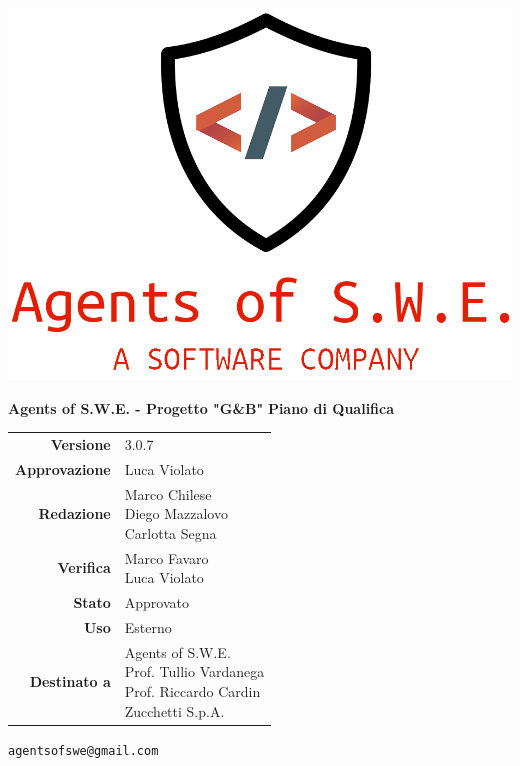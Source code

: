 


\begin{titlepage}
\thispagestyle{empty}

\begin{center}

\includegraphics[scale=0.3]{./images/logo.png} 

\large \textbf{Agents of S.W.E. - Progetto "G\&B"}
\vfill
\Huge \textbf{Piano di Qualifica}
\vfill
\large
\renewcommand{\arraystretch}{1.3}
\begin{tabular}{r|l}
\textbf{Versione} & 3.0.7\\
\textbf{Approvazione} & Luca Violato\\
\textbf{Redazione} & \parbox[t]{5cm}{Marco Chilese\\Diego Mazzalovo\\Carlotta Segna}\\
\textbf{Verifica} & \parbox[t]{5cm}{Marco Favaro\\Luca Violato}\\
\textbf{Stato} & Approvato\\
\textbf{Uso} & Esterno\\
\textbf{Destinato a} & \parbox[t]{5cm}{Agents of S.W.E. \\Prof. Tullio Vardanega\\Prof. Riccardo Cardin\\Zucchetti S.p.A.}
\end{tabular}
\vfill
\small
\texttt{agentsofswe@gmail.com}
\end{center}
\end{titlepage}

